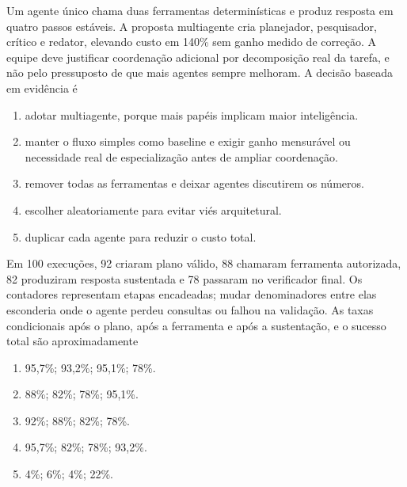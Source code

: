 \TextoBase
Um agente único chama duas ferramentas determinísticas e produz resposta em quatro passos estáveis. A proposta multiagente cria planejador, pesquisador, crítico e redator, elevando custo em 140\% sem ganho medido de correção.
A equipe deve justificar coordenação adicional por decomposição real da tarefa, e não pelo pressuposto de que mais agentes sempre melhoram.
\FonteDidatica
\Comando A decisão baseada em evidência é
\begin{enumerate}[label=\Alph*)]
\item adotar multiagente, porque mais papéis implicam maior inteligência.
\item manter o fluxo simples como baseline e exigir ganho mensurável ou necessidade real de especialização antes de ampliar coordenação.
\item remover todas as ferramentas e deixar agentes discutirem os números.
\item escolher aleatoriamente para evitar viés arquitetural.
\item duplicar cada agente para reduzir o custo total.
\end{enumerate}

\TextoBase
Em 100 execuções, 92 criaram plano válido, 88 chamaram ferramenta autorizada, 82 produziram resposta sustentada e 78 passaram no verificador final.
Os contadores representam etapas encadeadas; mudar denominadores entre elas esconderia onde o agente perdeu consultas ou falhou na validação.
\FonteDidatica
\Comando As taxas condicionais após o plano, após a ferramenta e após a sustentação, e o sucesso total são aproximadamente
\begin{enumerate}[label=\Alph*)]
\item 95,7\%; 93,2\%; 95,1\%; 78\%.
\item 88\%; 82\%; 78\%; 95,1\%.
\item 92\%; 88\%; 82\%; 78\%.
\item 95,7\%; 82\%; 78\%; 93,2\%.
\item 4\%; 6\%; 4\%; 22\%.
\end{enumerate}

